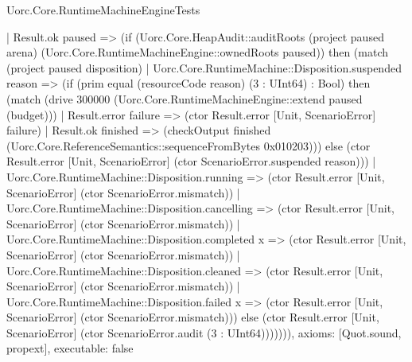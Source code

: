 \begin{lexlean}{Uorc.Core.RuntimeMachineEngineTests}
\begin{semanticmodule}
{      | Result.ok paused => (if (Uorc.Core.HeapAudit::auditRoots (project paused arena) (Uorc.Core.RuntimeMachineEngine::ownedRoots paused)) then (match (project paused disposition)
        | Uorc.Core.RuntimeMachine::Disposition.suspended reason => (if (prim equal (resourceCode reason) (3 : UInt64) : Bool) then (match (drive 300000 (Uorc.Core.RuntimeMachineEngine::extend paused (budget)))
          | Result.error failure => (ctor Result.error [Unit, ScenarioError] failure)
          | Result.ok finished => (checkOutput finished (Uorc.Core.ReferenceSemantics::sequenceFromBytes 0x010203))) else (ctor Result.error [Unit, ScenarioError] (ctor ScenarioError.suspended reason)))
        | Uorc.Core.RuntimeMachine::Disposition.running => (ctor Result.error [Unit, ScenarioError] (ctor ScenarioError.mismatch))
        | Uorc.Core.RuntimeMachine::Disposition.cancelling => (ctor Result.error [Unit, ScenarioError] (ctor ScenarioError.mismatch))
        | Uorc.Core.RuntimeMachine::Disposition.completed x => (ctor Result.error [Unit, ScenarioError] (ctor ScenarioError.mismatch))
        | Uorc.Core.RuntimeMachine::Disposition.cleaned => (ctor Result.error [Unit, ScenarioError] (ctor ScenarioError.mismatch))
        | Uorc.Core.RuntimeMachine::Disposition.failed x => (ctor Result.error [Unit, ScenarioError] (ctor ScenarioError.mismatch))) else (ctor Result.error [Unit, ScenarioError] (ctor ScenarioError.audit (3 : UInt64))))))),
  axioms: [Quot.sound, propext],
  executable: false
}


\end{semanticmodule}
\end{lexlean}
